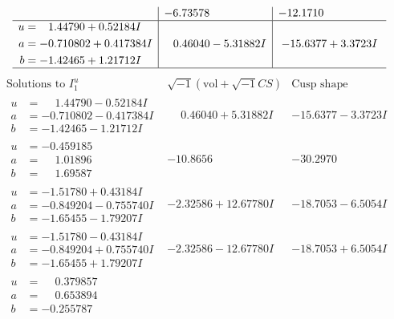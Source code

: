\documentclass[1p]{elsarticle_modified}
\theoremstyle{definition}
\newcommand{\I}{\sqrt{-1}}
\begin{document}
$$\begin{array}{c|c|c}
 & -6.73578\phantom{ +0.000000I} & -12.1710\phantom{ +0.000000I} \\ \hline\begin{aligned}
u &= \phantom{-}1.44790 + 0.52184 I \\
a &= -0.710802 + 0.417384 I \\
b &= -1.42465 + 1.21712 I\end{aligned}
 & \phantom{-}0.46040 - 5.31882 I & -15.6377 + 3.3723 I\\
 \hline 
 \end{array}$$\newpage$$\begin{array}{c|c|c}  
\text{Solutions to }I^u_{1}& \I (\text{vol} + \sqrt{-1}CS) & \text{Cusp shape}\\
 \hline 
\begin{aligned}
u &= \phantom{-}1.44790 - 0.52184 I \\
a &= -0.710802 - 0.417384 I \\
b &= -1.42465 - 1.21712 I\end{aligned}
 & \phantom{-}0.46040 + 5.31882 I & -15.6377 - 3.3723 I \\ \hline\begin{aligned}
u &= -0.459185\phantom{ +0.000000I} \\
a &= \phantom{-}1.01896\phantom{ +0.000000I} \\
b &= \phantom{-}1.69587\phantom{ +0.000000I}\end{aligned}
 & -10.8656\phantom{ +0.000000I} & -30.2970\phantom{ +0.000000I} \\ \hline\begin{aligned}
u &= -1.51780 + 0.43184 I \\
a &= -0.849204 - 0.755740 I \\
b &= -1.65455 - 1.79207 I\end{aligned}
 & -2.32586 + 12.67780 I & -18.7053 - 6.5054 I \\ \hline\begin{aligned}
u &= -1.51780 - 0.43184 I \\
a &= -0.849204 + 0.755740 I \\
b &= -1.65455 + 1.79207 I\end{aligned}
 & -2.32586 - 12.67780 I & -18.7053 + 6.5054 I \\ \hline\begin{aligned}
u &= \phantom{-}0.379857\phantom{ +0.000000I} \\
a &= \phantom{-}0.653894\phantom{ +0.000000I} \\
b &= -0.255787\phantom{ +0.000000I}\end{aligned}

\end{array}$$
\end{document}
